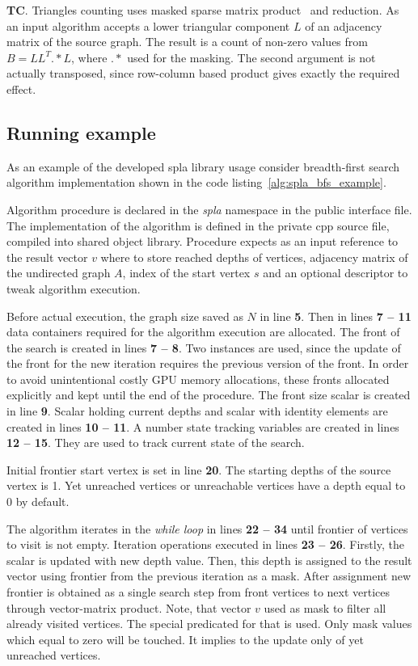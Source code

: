 \textbf{TC}. Triangles counting uses masked sparse matrix product~\cite{yang2019graphblast} and reduction. As an input algorithm accepts a lower triangular component $L$ of an adjacency matrix of the source graph. The result is a count of non-zero values from $B = LL^T .* L$, where $.*$ used for the masking. The second argument is not actually transposed, since row-column based product gives exactly the required effect.

\subsection{Running example}

As an example of the developed spla library usage consider breadth-first search algorithm implementation shown in the code listing~\ref{alg:spla_bfs_example}. 

Algorithm procedure is declared in the \textit{spla} namespace in the public interface file. The implementation of the algorithm is defined in the private cpp source file, compiled into shared object library. Procedure expects as an input reference to the result vector $v$ where to store reached depths of vertices, adjacency matrix of the undirected graph $A$, index of the start vertex $s$ and an optional descriptor to tweak algorithm execution.

Before actual execution, the graph size saved as $N$ in line \textbf{5}. Then in lines \textbf{7 -- 11} data containers required for the algorithm execution are allocated. The front of the search is created in lines \textbf{7 -- 8}. Two instances are used, since the update of the front for the new iteration requires the previous version of the front. In order to avoid unintentional costly GPU memory allocations, these fronts allocated explicitly and kept until the end of the procedure. The front size scalar is created in line \textbf{9}. Scalar holding current depths and scalar with identity elements are created in lines \textbf{10 -- 11}. A number state tracking variables are created in lines \textbf{12 -- 15}. They are used to track current state of the search.

Initial frontier start vertex is set in line \textbf{20}. The starting depths of the source vertex is 1. Yet unreached vertices or unreachable vertices have a depth equal to 0 by default.

The algorithm iterates in the \textit{while loop} in lines \textbf{22 -- 34} until frontier of vertices to visit is not empty. Iteration operations executed in lines \textbf{23 -- 26}. Firstly, the scalar is updated with new depth value. Then, this depth is assigned to the result vector using frontier from the previous iteration as a mask. After assignment new frontier is obtained as a single search step from front vertices to next vertices through vector-matrix product. Note, that vector $v$ used as mask to filter all already visited vertices. The special predicated for that is used. Only mask values which equal to zero will be touched. It implies to the update only of yet unreached vertices. 

